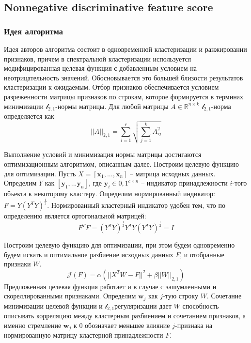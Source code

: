 \subsection{Nonnegative discriminative feature score}
\subsubsection{Идея алгоритма}
Идея авторов алгоритма состоит в одновременной кластеризации и ранжировании признаков, причем в спектральной кластеризации используется модифицированная целевая функция с добавленным условием на неотрицательность значений. Обосновывается это большей близости результатов кластеризации к ожидаемым. Отбор признаков обеспечивается условием разреженности матрицы признаков по строкам, которое формируется в терминах минимизации $\mathcal{l}_{2,1}$-нормы матрицы\cite{yang2011l2}. Для любой матрицы $A \in \mathbb{R}^{n \times k}$ $\mathcal{l}_{2,1}$-норма определяется как 
\begin{equation}
	||A||_{2,1} = \sum_{i=1}^r \sqrt{\sum_{j=1}^k A_{ij}^2}
\end{equation} 

Выполнение условий и минимизация нормы матрицы достигаются оптимизационным алгоритмом, описанным далее. Построим целевую функцию для оптимизации. Пусть $X = [\mathbf{x}_1,...,\mathbf{x}_n]$ -- матрица исходных данных. Определим $Y$ как $[\mathbf{y}_1,...\mathbf{y}_n]$, где $\mathbf{y}_i \in {0,1}^{c\times n}$ -- индикатор принадлежности $i$-того объекта к некоторому кластеру. Определим нормированный индикатор: $F=Y(Y^T Y)^\frac12$. Нормированный кластерный индикатор удобен тем, что по определению является ортогональной матрицей:
\begin{equation}
	F^T F = (Y^T Y)^\frac12 Y^T Y (Y^T Y)^\frac12 = I
\end{equation}

Построим целевую функцию для оптимизации, при этом будем одновременно будем искать и оптимальное разбиение исходных данных $F$, и отобранные признаки $W$. 
\begin{equation}
	\mathcal{J}(F) = \alpha(||X^T W - F||^2 + \beta||W||_{2,1})
\end{equation}
Предложенная целевая функция работает и в случае с зашумленными и скореллированными признаками. Определим $\mathbf{w}_j$ как $j$-тую строку $W$. Сочетание минимизации целевой функции и $\mathcal{l}_{2,1}$регуляризации дает $W$ способность описывать корреляцию между кластерным разбиением и сочетанием признаков, а именно стремление $\mathbf{w}_j$ к 0 обозначает меньшее влияние $j$-признака на нормированную матрицу кластерной принадлежности $F$.


